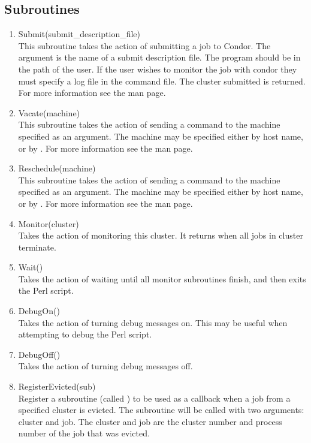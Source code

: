 \subsection{Subroutines}
\begin{enumerate}
	\item Submit(submit\_description\_file) \\
	This subroutine takes the action of submitting a job to Condor.
	The argument is the name of a submit description file.
	The  program should be in the
	path of the user.  If the user wishes to monitor the job with condor
	they must specify a log file in the command file.  The cluster
	submitted is returned. For more information
	see the  man page.
	
	\item Vacate(machine) \\
	This subroutine takes the action of sending a
	 command to the machine specified as an argument.
	The machine may be specified
	either by host name, or by .  For more information
	see the  man page.

	\item Reschedule(machine) \\
	This subroutine takes the action of sending a
	 command to the machine specified as an argument.
	The machine may be specified either
 	by host name, or by .  For more information see
	the  man page.

	\item Monitor(cluster) \\
	Takes the action of monitoring this cluster.
	It returns when all jobs in cluster terminate.
	
	\item Wait() \\
	Takes the action of waiting until all monitor subroutines finish,
	and then exits the Perl script.

	\item DebugOn() \\
	Takes the action of turning debug messages on.
	This may be useful when attempting to debug the Perl script.

	\item DebugOff() \\
	Takes the action of turning debug messages off.

	\item RegisterEvicted(sub) \\
	Register a subroutine (called )
	to be used as a callback when a job from
	a specified cluster is evicted.  The subroutine will be
	called with two arguments: cluster and job. The cluster
	and job are the cluster number and process number of the job that
	was evicted.
	

\end{enumerate}

